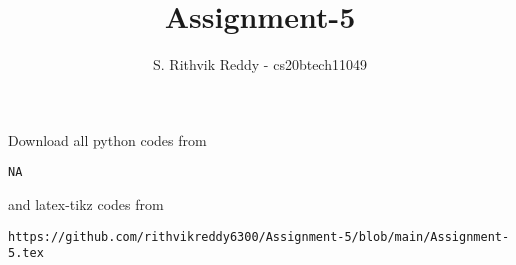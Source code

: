 \documentclass[journal,12pt,twocolumn]{IEEEtran}
\DeclareMathOperator*{\Res}{Res}
\begin{document}
\newcommand{\BEQA}{\begin{eqnarray}}
\newcommand{\EEQA}{\end{eqnarray}}
\newcommand{\define}{\stackrel{\triangle}{=}}

\raggedbottom
\setlength{\parindent}{0pt}
\providecommand{\mbf}{\mathbf}
\providecommand{\pr}[1]{\ensuremath{\Pr\left(#1\right)}}
\providecommand{\qfunc}[1]{\ensuremath{Q\left(#1\right)}}
\providecommand{\sbrak}[1]{\ensuremath{{}\left[#1\right]}}
\providecommand{\lsbrak}[1]{\ensuremath{{}\left[#1\right.}}
\providecommand{\rsbrak}[1]{\ensuremath{{}\left.#1\right]}}
\providecommand{\brak}[1]{\ensuremath{\left(#1\right)}}
\providecommand{\lbrak}[1]{\ensuremath{\left(#1\right.}}
\providecommand{\rbrak}[1]{\ensuremath{\left.#1\right)}}
\providecommand{\cbrak}[1]{\ensuremath{\left\{#1\right\}}}
\providecommand{\lcbrak}[1]{\ensuremath{\left\{#1\right.}}
\providecommand{\rcbrak}[1]{\ensuremath{\left.#1\right\}}}
\theoremstyle{remark}
\newtheorem{rem}{Remark}
\newcommand{\sgn}{\mathop{\mathrm{sgn}}}
\providecommand{\abs}[1]{\vert#1\vert}
\providecommand{\res}[1]{\Res\displaylimits_{#1}} 
\providecommand{\norm}[1]{\lVert#1\rVert}
\providecommand{\mtx}[1]{\mathbf{#1}}
\providecommand{\mean}[1]{E[ #1 ]}
\providecommand{\fourier}{\overset{\mathcal{F}}{ \rightleftharpoons}}
\providecommand{\system}{\overset{\mathcal{H}}{ \longleftrightarrow}}
\newcommand{\solution}{\noindent \textbf{Solution: }}
\newcommand{\cosec}{\,\text{cosec}\,}
\providecommand{\dec}[2]{\ensuremath{\overset{#1}{\underset{#2}{\gtrless}}}}
\newcommand{\myvec}[1]{\ensuremath{\begin{pmatrix}#1\end{pmatrix}}}
\newcommand{\mydet}[1]{\ensuremath{\begin{vmatrix}#1\end{vmatrix}}}
\makeatletter
{}
\makeatother
\let\StandardTheFigure\thefigure
\let\vec\mathbf
\renewcommand{\thefigure}{\theproblem}
\def\putbox#1#2#3{\makebox[0in][l]{\makebox[#1][l]{}\raisebox{\baselineskip}[0in][0in]{\raisebox{#2}[0in][0in]{#3}}}}
     \def\rightbox#1{\makebox[0in][r]{#1}}
     \def\centbox#1{\makebox[0in]{#1}}
     \def\topbox#1{\raisebox{-\baselineskip}[0in][0in]{#1}}
     \def\midbox#1{\raisebox{-0.5\baselineskip}[0in][0in]{#1}}
\vspace{3cm}
\title{Assignment-5}
\author{S. Rithvik Reddy - cs20btech11049}
\maketitle
\newpage
\bigskip
\renewcommand{\thefigure}{\theenumi}
\renewcommand{\thetable}{\theenumi}
Download all python codes from 
\begin{lstlisting}
NA
\end{lstlisting}
%
and latex-tikz codes from 
%
\begin{lstlisting}
https://github.com/rithvikreddy6300/Assignment-5/blob/main/Assignment-5.tex
\end{lstlisting}
\end{document}
